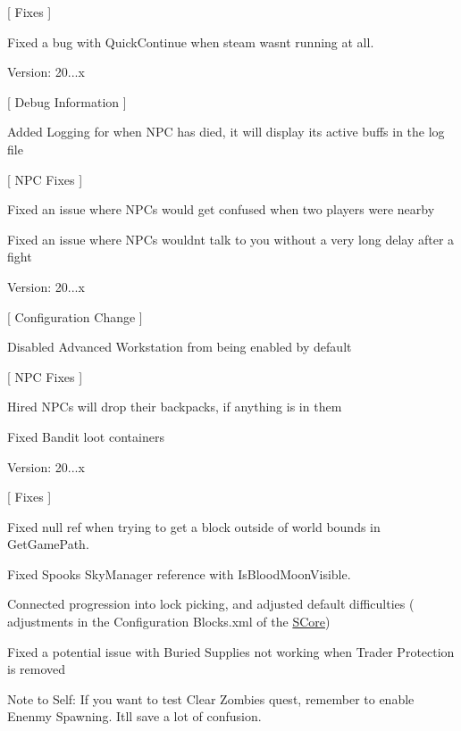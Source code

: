 \mbox{[} Fixes \mbox{]}
\begin{DoxyItemize}
\item Fixed a bug with Quick\+Continue when steam wasn\textquotesingle{}t running at all.
\end{DoxyItemize}

Version\+: 20...\+x

\mbox{[} Debug Information \mbox{]}
\begin{DoxyItemize}
\item Added Logging for when NPC has died, it will display its active buffs in the log file
\end{DoxyItemize}

\mbox{[} NPC Fixes \mbox{]}
\begin{DoxyItemize}
\item Fixed an issue where NPCs would get confused when two players were nearby
\item Fixed an issue where NPCs wouldn\textquotesingle{}t talk to you without a very long delay after a fight
\end{DoxyItemize}

Version\+: 20...\+x

\mbox{[} Configuration Change \mbox{]}
\begin{DoxyItemize}
\item Disabled Advanced Workstation from being enabled by default
\end{DoxyItemize}

\mbox{[} NPC Fixes \mbox{]}
\begin{DoxyItemize}
\item Hired NPCs will drop their backpacks, if anything is in them
\item Fixed Bandit loot containers
\end{DoxyItemize}

Version\+: 20...\+x

\mbox{[} Fixes \mbox{]}
\begin{DoxyItemize}
\item Fixed null ref when trying to get a block outside of world bounds in Get\+Game\+Path.
\item Fixed Spook\textquotesingle{}s Sky\+Manager reference with Is\+Blood\+Moon\+Visible.
\item Connected progression into lock picking, and adjusted default difficulties ( adjustments in the Configuration Blocks.\+xml of the \mbox{\hyperlink{namespace_s_core}{SCore}})
\item Fixed a potential issue with Buried Supplies not working when Trader Protection is removed
\begin{DoxyItemize}
\item Note to Self\+: If you want to test Clear Zombies quest, remember to enable Enenmy Spawning. It\textquotesingle{}ll save a lot of confusion.
\end{DoxyItemize}
\end{DoxyItemize}


